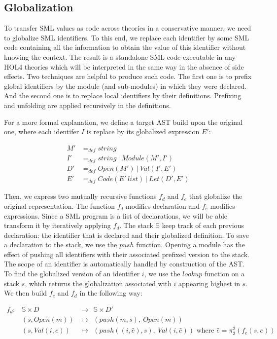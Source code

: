 \documentclass[runningheads,a4paper,draft]{svjour3}
\def\holfour{\textsf{HOL4}\xspace}
\def\sml{\textsf{SML}\xspace}
\begin{document}
\subsection{Globalization}
To transfer \sml values as code across theories in a conservative manner, we 
need to 
globalize \sml identifiers. To this end, we replace each identifier by some 
\sml code containing all the information to obtain the value of this identifier 
without knowing the context. The result is a standalone \sml code executable in 
any \holfour theories which will be interpreted in the same way in the absence 
of side effects. Two techniques are helpful to produce such code. The first one 
is to prefix global identifiers by the module (and sub-modules) in which they 
were declared. And the second one is to replace local identifiers 
by their definitions. Prefixing and 
unfolding are applied recursively in 
the definitions.

For a more formal explanation, we define a target AST build upon the original 
one, where each identifer $I$ is replace by its globalized expression $E'$:

\begin{align*}
M' &=_{def} string \\
I' &=_{def} string\ \vert\ Module(M',I')\\
D' & =_{def} Open(M')\ \vert\  Val (I',E') \\
E' &=_{def} Code(E'\ list)\ \vert\ Let (D',E') 
\end{align*}

Then, we express two mutually recursive functions $f_d$ and 
$f_e$ that globalize the original representation. The 
function $f_d$ modifies declaration and $f_e$ modifies expressions. Since a 
\sml program is a list of declarations, we will be able transform it by 
iteratively applying $f_d$. The stack 
$\mathbb{S}$ keep track of each previous declaration: the identifier that is 
declared and their globalized definition. To save a declaration to 
the stack, we use the $push$ 
function. Opening a module has the effect of pushing all identifiers with 
their associated prefixed version to the stack. The scope of an identifier is 
automatically handled by construction of the AST. To find the globalized 
version of an identifier $i$, we use the $lookup$ function on a stack $s$, 
which returns the globalization associated with $i$ appearing highest in $s$. 
We then build $f_e$ and $f_d$ in the following way:
\vspace{5mm}

\begin{math}
\begin{array}{lcl}
f_d:& \mathbb{S} \times D &\rightarrow\ \ \mathbb{S} \times D'\\
& (s, Open(m)) &\mapsto\ \ (push(m,s),\ Open(m)) \\
& (s, Val(i,e)) &\mapsto\ \ (push ((i,\hat{e}),s),\ Val(i, \hat{e})) 
\mbox{ where } \hat{e} = \pi_2^2 (f_e (s,e))
\end{array}
\end{math}
\end{document}
